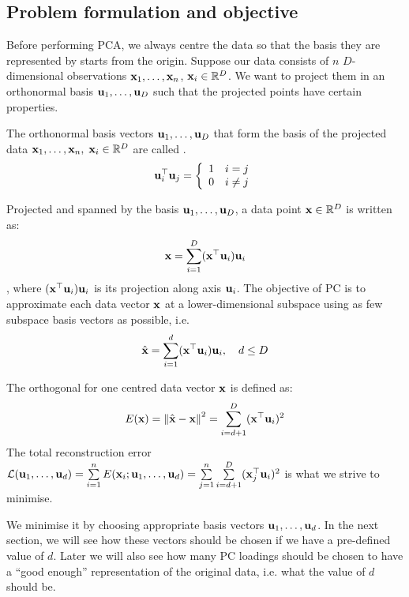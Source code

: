 \documentclass[a4paper]{article}
\begin{document}
\subsection{Problem formulation and objective}
Before performing PCA, we always centre the data so that the basis they are represented by starts from the origin. Suppose our data consists of $n$ $D$-dimensional observations $\textbf{x}_1,\ldots,\textbf{x}_n$, $\textbf{x}_i\in\mathbb{R}^D$. We want to project them in an orthonormal basis $\textbf{u}_1,\ldots,\textbf{u}_D$ such that the projected points have certain properties.
\begin{definition}[PC loadings]
The orthonormal basis vectors $\textbf{u}_1,\ldots,\textbf{u}_D$ that form the basis of the projected data $\textbf{x}_1,\ldots,\textbf{x}_n, \; \textbf{x}_i\in\mathbb{R}^D$ are called .
\begin{equation}
    \textbf{u}_i^{\top}\textbf{u}_j= \left\{
\begin{array}{ll}
      1 & i=j \\
      0 & i\neq j \\
\end{array} 
\right.
\end{equation}
\end{definition}
Projected and spanned by the basis $\textbf{u}_1,\ldots,\textbf{u}_D$, a data point $\textbf{x}\in \mathbb{R}^D$ is written as:
\begin{equation*}
    \textbf{x} = \sum\limits_{i=1}^{D}(\textbf{x}^{\top}\textbf{u}_i)\textbf{u}_i
\end{equation*}
, where $(\textbf{x}^{\top}\textbf{u}_i)\textbf{u}_i$ is its projection along axis $\textbf{u}_i$.
The objective of PC is to approximate each data vector $\textbf{x}$ at a lower-dimensional subspace using as few subspace basis vectors as possible, i.e.
\begin{equation}
    \hat{\textbf{x}} = \sum\limits_{i=1}^{d}(\textbf{x}^{\top}\textbf{u}_i)\textbf{u}_i , \quad d \leq D
\end{equation} 


\begin{corollary}
The orthogonal  for one centred data vector $\textbf{x}$ is defined as:
\begin{equation}
    E(\textbf{x}) = \left\lVert\hat{\textbf{x}}- \textbf{x}\right\rVert^2 = \sum\limits_{i=d+1}^D  (\textbf{x}^{\top}\textbf{u}_i)^2
\end{equation}
The total reconstruction error $\mathcal{L}(\textbf{u}_1,\ldots,\textbf{u}_d)=\sum\limits_{i=1}^n E(\textbf{x}_i;\textbf{u}_1,\ldots,\textbf{u}_d) = \sum\limits_{j=1}^n\sum\limits_{i=d+1}^D(\textbf{x}_j^{\top}\textbf{u}_i)^2$ is what we strive to minimise.
\end{corollary}
 We minimise it by choosing appropriate basis vectors $\textbf{u}_1,\ldots,\textbf{u}_d$. In the next section, we will see how these vectors  should be chosen if we have a pre-defined value of $d$. Later we will also see how many PC loadings should be chosen to have a ``good enough'' representation of the original data, i.e. what the value of $d$ should be.
 
\end{document}
